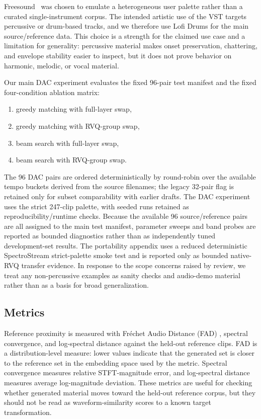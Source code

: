 \documentclass[twoside,a4paper]{article}
\begin{document}
Freesound~\cite{fonseca2017freesound} was chosen to emulate a heterogeneous user palette rather than a curated single-instrument corpus. The intended artistic use of the VST targets percussive or drum-based tracks, and we therefore use Lofi Drums for the main source/reference data. This choice is a strength for the claimed use case and a limitation for generality: percussive material makes onset preservation, chattering, and envelope stability easier to inspect, but it does not prove behavior on harmonic, melodic, or vocal material.

Our main DAC experiment evaluates the fixed 96-pair test manifest and the fixed four-condition ablation matrix:
\begin{enumerate}
    \item greedy matching with full-layer swap,
    \item greedy matching with RVQ-group swap,
    \item beam search with full-layer swap,
    \item beam search with RVQ-group swap.
\end{enumerate}
The 96 DAC pairs are ordered deterministically by round-robin over the available tempo buckets derived from the source filenames; the legacy 32-pair flag is retained only for subset comparability with earlier drafts. The DAC experiment uses the strict 247-clip palette, with seeded runs retained as reproducibility/runtime checks. Because the available 96 source/reference pairs are all assigned to the main test manifest, parameter sweeps and band probes are reported as bounded diagnostics rather than as independently tuned development-set results. The portability appendix uses a reduced deterministic SpectroStream strict-palette smoke test and is reported only as bounded native-RVQ transfer evidence. In response to the scope concerns raised by review, we treat any non-percussive examples as sanity checks and audio-demo material rather than as a basis for broad generalization.

\subsection{Metrics}

Reference proximity is measured with Fr\'echet Audio Distance (FAD) \cite{Kilgour:2019:FAD}, spectral convergence, and log-spectral distance against the held-out reference clips. FAD is a distribution-level measure: lower values indicate that the generated set is closer to the reference set in the embedding space used by the metric. Spectral convergence measures relative STFT-magnitude error, and log-spectral distance measures average log-magnitude deviation. These metrics are useful for checking whether generated material moves toward the held-out reference corpus, but they should not be read as waveform-similarity scores to a known target transformation.
\end{document}
